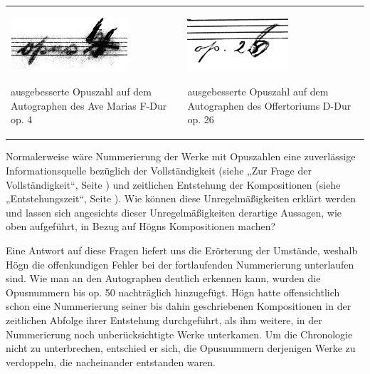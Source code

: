 \begin{center}
\begin{minipage}{9.241cm}
\begin{center}
\tablefirsthead{}
\tablehead{}
\tabletail{}
\tablelasttail{}
\begin{supertabular}{m{4.5470004cm}m{4.294cm}}

\includegraphics[width=4.364cm,height=2.007cm]{pictures/zulassungsarbeit-img060.png}

ausgebesserte Opuszahl auf dem
Autographen des Ave Marias F-Dur op. 4 &

\includegraphics[width=3.739cm,height=2cm]{pictures/zulassungsarbeit-img061.png}

ausgebesserte Opuszahl auf dem
Autographen des Offertoriums D-Dur op. 26\\
\end{supertabular}
\end{center}
\end{minipage}
\end{center}
Normalerweise wäre Nummerierung der Werke mit Opuszahlen eine
zuverlässige Informationsquelle bezüglich der Vollständigkeit (siehe
 „Zur Frage der Vollständigkeit“, Seite
) und zeitlichen Entstehung der Kompositionen
(siehe  „Entstehungszeit“, Seite
). Wie können diese Unregelmäßigkeiten erklärt
werden und lassen sich angesichts dieser Unregelmäßigkeiten derartige
Aussagen, wie oben aufgeführt, in Bezug auf Högns Kompositionen machen?

Eine Antwort auf diese Fragen liefert uns die Erörterung der Umstände,
weshalb Högn die offenkundigen Fehler bei der fortlaufenden
Nummerierung unterlaufen sind. Wie man an den Autographen deutlich
erkennen kann, wurden die Opusnummern bis op. 50 nachträglich
hinzugefügt. Högn hatte offensichtlich schon eine Nummerierung seiner
bis dahin geschriebenen Kompositionen in der zeitlichen Abfolge ihrer
Entstehung durchgeführt, als ihm weitere, in der Nummerierung noch
unberücksichtigte Werke unterkamen. Um die Chronologie nicht zu
unterbrechen, entschied er sich, die Opusnummern derjenigen Werke zu
verdoppeln, die nacheinander entstanden waren.

